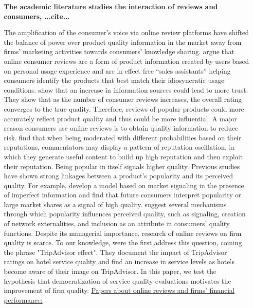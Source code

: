 \textbf{The academic literature studies the interaction of reviews and consumers,  ...cite...} 

The amplification of the consumer's voice via online review platforms have shifted the balance of power over product quality information in the market away from firms' marketing activities towards consumers' knowledge sharing. \citet{chen2008online} argue that online consumer reviews are a form of product information created by users based on personal usage experience and are in effect free “sales assistants” helping consumers identify the products that best match their idiosyncratic usage conditions.
\citet{chen2004impact} show that an increase in information sources could lead to more trust. They show that as the number of consumer reviews increases, the overall rating converges to the true quality. Therefore, reviews of popular products could more accurately reflect product quality and thus could be more influential. A major reason consumers use online reviews is to obtain quality information to reduce risk. \citet{chen2011moderated} find that when being moderated with different probabilities based on their reputations, commentators may display a pattern of reputation oscillation, in which they generate useful content to build up high reputation and then exploit their reputation. Being popular in itself signals higher quality. Previous studies have shown strong linkages between a product’s popularity and its perceived quality. For example, \citet{caminal1996market} develop a model based on market signaling in the presence of imperfect information and find that future consumers interpret popularity or large market shares as a signal of high quality. \citet{hellofs1999market} suggest several mechanisms through which popularity influences perceived quality, such as signaling, creation of network externalities, and inclusion as an attribute in consumers’ quality functions. Despite its managerial importance, research of online reviews on firm quality is scarce. To our knowledge, \citet{smyth2010does} were the first address this question, coining the phrase "TripAdvisor effect". They document the impact of TripAdvisor ratings on hotel service quality and find an increase in service levels as hotels become aware of their image on TripAdvisor. In this paper, we test the hypothesis that democratization of service quality evaluations motivates the improvement of firm quality.
\underline{Papers about online reviews and firms' financial performance:} 

